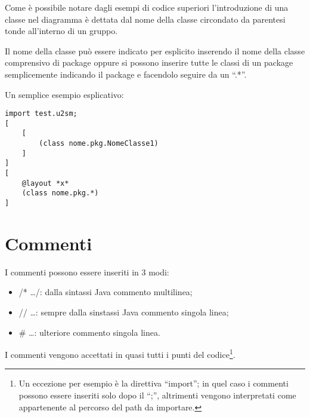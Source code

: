 Come è possibile notare dagli esempi di codice superiori l'introduzione di una
classe nel diagramma è dettata dal nome della classe circondato da parentesi
tonde all'interno di un gruppo.

Il nome della classe può essere indicato per esplicito inserendo il nome della
classe comprensivo di package oppure si possono inserire tutte le classi di un
package semplicemente indicando il package e facendolo seguire da un ``.*''.

Un semplice esempio esplicativo:

\begin{lstlisting}[caption={Diagramma decorato di attributi}, style={layout}] 
import test.u2sm;
[
	[	
		(class nome.pkg.NomeClasse1)
	]
]
[
	@layout *x*
	(class nome.pkg.*)
]
\end{lstlisting}

\section{Commenti}

I commenti possono essere inseriti in 3 modi:
\begin{itemize}
  \item /* \ldots */: dalla sintassi Java commento multilinea;
  \item // \ldots: sempre dalla sinstassi Java commento singola linea;
  \item \# \ldots: ulteriore commento singola linea.
\end{itemize}


I commenti vengono accettati in quasi tutti i punti del codice\footnote{Un
eccezione per esempio è la direttiva ``import''; in quel caso i commenti possono essere
inseriti solo dopo il ``;'', altrimenti vengono interpretati come appartenente
al percorso del path da importare.}.
